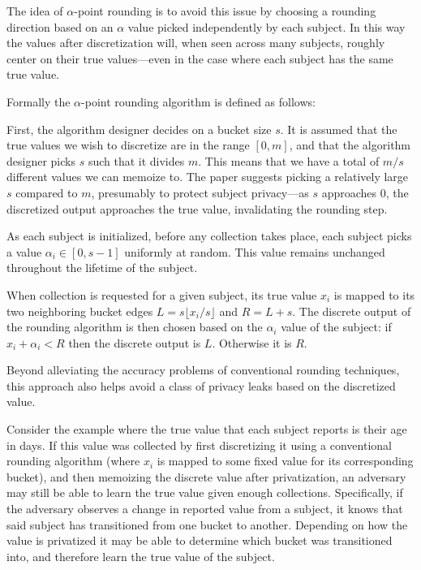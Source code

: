 \documentclass[a4paper,12pt]{article}
\begin{document}
The idea of $\alpha$-point rounding is to avoid this issue by choosing a rounding direction based on an $\alpha$ value picked independently by each subject. In this way the values after discretization will, when seen across many subjects, roughly center on their true values---even in the case where each subject has the same true value.

Formally the $\alpha$-point rounding algorithm is defined as follows:

First, the algorithm designer decides on a bucket size $s$. It is assumed that the true values we wish to discretize are in the range $[0,m]$, and that the algorithm designer picks $s$ such that it divides $m$. This means that we have a total of $m/s$ different values we can memoize to. The paper suggests picking a relatively large $s$ compared to $m$, presumably to protect subject privacy---as $s$ approaches 0, the discretized output approaches the true value, invalidating the rounding step.

As each subject is initialized, before any collection takes place, each subject picks a value $\alpha_i \in [0,s-1]$ uniformly at random. This value remains unchanged throughout the lifetime of the subject.

When collection is requested for a given subject, its true value $x_i$ is mapped to its two neighboring bucket edges $L=s \lfloor x_i / s \rfloor$ and $R=L+s$. The discrete output of the rounding algorithm is then chosen based on the $\alpha_i$ value of the subject: if $x_i + \alpha_i < R$ then the discrete output is $L$. Otherwise it is $R$. 

Beyond alleviating the accuracy problems of conventional rounding techniques, this approach also helps avoid a class of privacy leaks based on the discretized value.

Consider the example where the true value that each subject reports is their age in days. If this value was collected by first discretizing it using a conventional rounding algorithm (where $x_i$ is mapped to some fixed value for its corresponding bucket), and then memoizing the discrete value after privatization, an adversary may still be able to learn the true value given enough collections. Specifically, if the adversary observes a change in reported value from a subject, it knows that said subject has transitioned from one bucket to another. Depending on how the value is privatized it may be able to determine which bucket was transitioned into, and therefore learn the true value of the subject.
\end{document}
